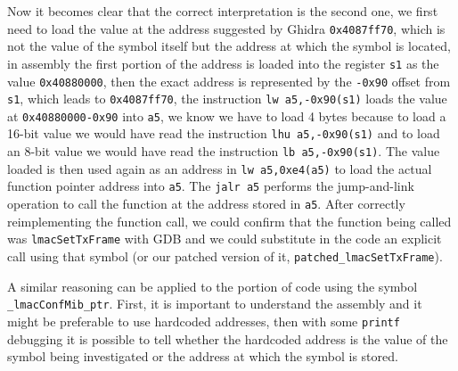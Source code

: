 
Now it becomes clear that the correct interpretation is the second one,
we first need to load the value at the address suggested by Ghidra \texttt{0x4087ff70},
which is not the value of the symbol itself but the address at which the symbol is located,
in assembly the first portion of the address is loaded into the register \texttt{s1} as
the value \texttt{0x40880000}, then the exact address is represented by
the \texttt{-0x90} offset from \texttt{s1}, which leads to \texttt{0x4087ff70},
the instruction \texttt{lw a5,-0x90(s1)} loads the value at \texttt{0x40880000-0x90} into \texttt{a5},
we know we have to load 4 bytes because to load a 16-bit value we would have read the instruction
\texttt{lhu a5,-0x90(s1)} and to load an 8-bit value we would have read the instruction
\texttt{lb a5,-0x90(s1)}. 
The value loaded is then used again as an address in \texttt{lw a5,0xe4(a5)} to load
the actual function pointer address into \texttt{a5}. 
The \texttt{jalr a5} performs the jump-and-link operation to call the function at the address
stored in \texttt{a5}.
After correctly reimplementing the function call, we could confirm that the function being
called was \texttt{lmacSetTxFrame} with GDB and we could substitute in the code an explicit
call using that symbol (or our patched version of it, \texttt{patched\_lmacSetTxFrame}).

A similar reasoning can be applied to the portion of code using the symbol \texttt{\_lmacConfMib\_ptr}.
First, it is important to understand the assembly and it might be preferable to use hardcoded addresses,
then with some \texttt{printf} debugging it is possible to tell whether the hardcoded address
is the value of the symbol being investigated or the address at which the symbol is stored.


